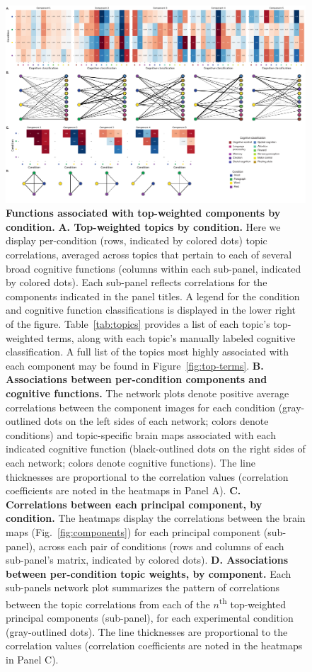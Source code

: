 \documentclass[english]{article}
\begin{document}
\begin{figure}[tp]
  \centering
  \includegraphics[width=\textwidth]{figs/components_neurosynth_full}

\caption{\textbf{Functions associated with top-weighted components by
condition.} \textbf{A. Top-weighted topics by condition.} Here we display
per-condition (rows, indicated by colored dots) topic correlations, averaged
across topics that pertain to each of several broad cognitive functions
(columns within each sub-panel, indicated by colored dots). Each sub-panel
reflects correlations for the components indicated in the panel titles. A
legend for the condition and cognitive function classifications is displayed in
the lower right of the figure. Table~\ref{tab:topics} provides a list of each topic's
top-weighted terms, along with each topic's manually labeled cognitive
classification. A full list of the topics most highly associated with each
component may be found in Figure~\ref{fig:top-terms}. \textbf{B. Associations
between per-condition components and cognitive functions.} The network plots
denote positive average correlations between the component images for each
condition (gray-outlined dots on the left sides of each network; colors denote
conditions) and topic-specific brain maps associated with each indicated
cognitive function (black-outlined dots on the right sides of each network;
colors denote cognitive functions). The line thicknesses are proportional to
the correlation values (correlation coefficients are noted in the heatmaps in
Panel A). \textbf{C. Correlations between each principal component, by
condition.} The heatmaps display the correlations between the brain maps
(Fig.~\ref{fig:components}) for each principal component (sub-panel), across each
pair of conditions (rows and columns of each sub-panel's matrix, indicated by
colored dots). \textbf{D. Associations between per-condition topic weights, by
component.} Each sub-panels network plot summarizes the pattern of correlations
between the topic correlations from each of the $n$\textsuperscript{th}
top-weighted principal components (sub-panel), for each experimental condition
(gray-outlined dots). The line thicknesses are proportional to the correlation
values (correlation coefficients are noted in the heatmaps in Panel C).}

\label{fig:neurosynth-full}
\end{figure}

\newpage
\renewcommand{\refname}{Supplemental references}


\end{document}
